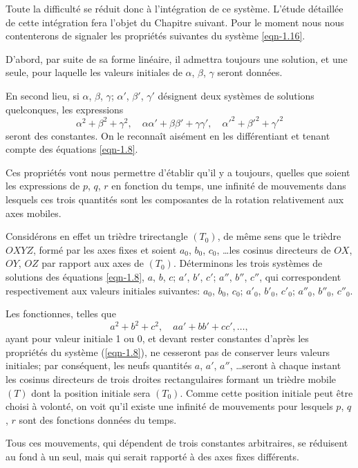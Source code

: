 Toute la difficulté se réduit donc à l'intégration de ce système. L'étude détaillée de cette intégration fera l'objet 
du Chapitre suivant. Pour le moment nous nous contenterons de signaler les propriétés suivantes du système 
\ref{eqn-1.16}.

D'abord, par suite de sa forme linéaire, il admettra toujours une solution, et une seule, pour laquelle les valeurs 
initiales de $\alpha$, $\beta$, $\gamma$ seront données.

En second lieu, si $\alpha$, $\beta$, $\gamma$; $\alpha'$, $\beta'$, $\gamma'$ désignent deux systèmes de solutions 
quelconques, les expressions
\[
	\alpha^2 + \beta^2 + \gamma^2,
	 \quad \alpha\alpha' + \beta\beta' + \gamma\gamma',
	 \quad \alpha'^2 + \beta'^2 + \gamma'^2
\]
seront des constantes. On le reconnaît aisément en les différentiant et tenant compte des équations \ref{eqn-1.8}.

Ces propriétés vont nous permettre d'établir qu'il y a toujours, quelles que soient	les expressions de $p$, $q$, $r$ en 
fonction du temps, une infinité de mouvements dans lesquels ces trois quantités sont les composantes de la rotation 
relativement aux axes mobiles.

Considérons en effet un trièdre trirectangle $(T_0)$, de même sens que le trièdre $OXYZ$, formé par les axes fixes et 
soient $a_0$, $b_0$, $c_0$, \ldots les cosinus directeurs de $OX$, $OY$, $OZ$ par rapport aux axes de $(T_0)$. 
Déterminons les trois systèmes de solutions des équations \ref{eqn-1.8}, $a$, $b$, $c$; $a'$, $b'$, $c'$; $a''$, $b''$, 
$c''$, qui correspondent respectivement aux valeurs initiales suivantes: $a_0$, $b_0$, $c_0$; $a'_0$, $b'_0$, $c'_0$; 
$a''_0$, $b''_0$, $c''_0$.

Les fonctionnes, telles que
\[
	a^2 + b^2 + c^2, \quad aa' + bb' + cc', \ldots,
\]
ayant pour valeur initiale 1 ou 0, et devant rester constantes d'après les propriétés du système (\ref{eqn-1.8}), ne 
cesseront pas de conserver leurs valeurs initiales; par conséquent, les neufs quantités $a$, $a'$, $a''$, \ldots seront 
à chaque instant les cosinus directeurs de trois droites rectangulaires formant un trièdre mobile $(T)$ dont la 
position initiale sera $(T_0)$. Comme cette position initiale peut être choisi à volonté, on voit qu'il existe une 
infinité de mouvements pour lesquels $p$, $q$, $r$ sont des fonctions données du temps.

Tous ces mouvements, qui dépendent de trois constantes arbitraires, se réduisent au fond à un seul, mais qui serait 
rapporté à des axes fixes différents.

